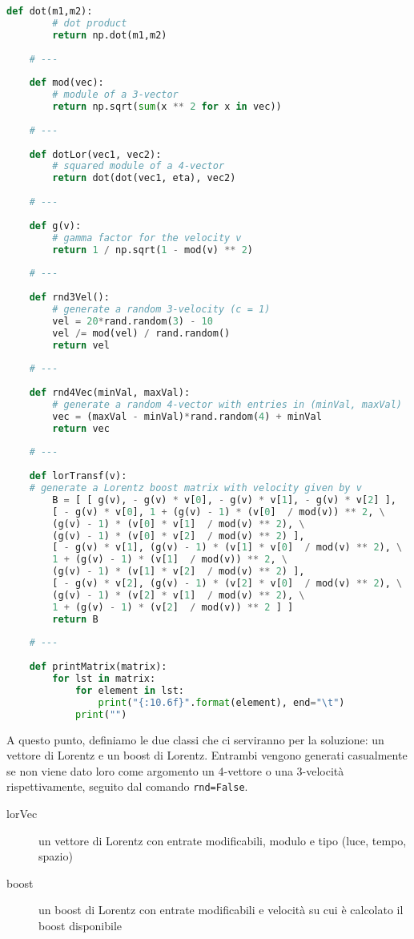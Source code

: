 \documentclass[12pt]{report}
\begin{document}
\begin{lstlisting}[language=Python]
	def dot(m1,m2):
		# dot product
		return np.dot(m1,m2)
	
	# ---
	
	def mod(vec):
		# module of a 3-vector
		return np.sqrt(sum(x ** 2 for x in vec))
	
	# ---
	
	def dotLor(vec1, vec2):
		# squared module of a 4-vector
		return dot(dot(vec1, eta), vec2)
	
	# ---
	
	def g(v):
		# gamma factor for the velocity v
		return 1 / np.sqrt(1 - mod(v) ** 2)
	
	# ---
	
	def rnd3Vel():
		# generate a random 3-velocity (c = 1)
		vel = 20*rand.random(3) - 10
		vel /= mod(vel) / rand.random()
		return vel
	
	# ---
	
	def rnd4Vec(minVal, maxVal):
		# generate a random 4-vector with entries in (minVal, maxVal)
		vec = (maxVal - minVal)*rand.random(4) + minVal
		return vec
	
	# ---
	
	def lorTransf(v):
	# generate a Lorentz boost matrix with velocity given by v
		B = [ [ g(v), - g(v) * v[0], - g(v) * v[1], - g(v) * v[2] ],
		[ - g(v) * v[0], 1 + (g(v) - 1) * (v[0]  / mod(v)) ** 2, \
		(g(v) - 1) * (v[0] * v[1]  / mod(v) ** 2), \
		(g(v) - 1) * (v[0] * v[2]  / mod(v) ** 2) ],
		[ - g(v) * v[1], (g(v) - 1) * (v[1] * v[0]  / mod(v) ** 2), \
		1 + (g(v) - 1) * (v[1]  / mod(v)) ** 2, \
		(g(v) - 1) * (v[1] * v[2]  / mod(v) ** 2) ],
		[ - g(v) * v[2], (g(v) - 1) * (v[2] * v[0]  / mod(v) ** 2), \
		(g(v) - 1) * (v[2] * v[1]  / mod(v) ** 2), \
		1 + (g(v) - 1) * (v[2]  / mod(v)) ** 2 ] ]
		return B
	
	# ---
	
	def printMatrix(matrix):
		for lst in matrix:
			for element in lst:
				print("{:10.6f}".format(element), end="\t")
			print("")
\end{lstlisting}

A questo punto, definiamo le due classi che ci serviranno per la soluzione: un vettore di Lorentz e un boost di Lorentz. Entrambi vengono generati casualmente se non viene dato loro come argomento un 4-vettore o una 3-velocità rispettivamente, seguito dal comando \lstinline|rnd=False|.

\begin{description}
	\item[lorVec] un vettore di Lorentz con entrate modificabili, modulo e tipo (luce, tempo, spazio)
	
	\item[boost] un boost di Lorentz con entrate modificabili e velocità su cui è calcolato il boost disponibile
\end{description}
\end{document}
